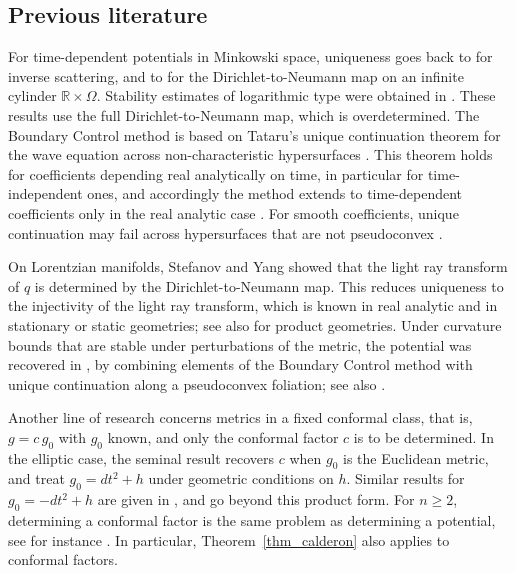 \documentclass[12pt,reqno]{amsart}
\numberwithin{equation}{section}
\theoremstyle{definition}
\theoremstyle{plain}
\theoremstyle{definition}
\theoremstyle{definition}
\newcommand{\R}{\mathbb{R}}
\def\R{\mathbb R}
\begin{document}
\subsection{Previous literature}

For time-dependent potentials in Minkowski space, uniqueness goes back to \cite{stefanov1989uniqueness} for inverse scattering, and to \cite{ramm1991} for the Dirichlet-to-Neumann map on an infinite cylinder $\R\times\Omega$. Stability estimates of logarithmic type were obtained in \cite{ben-aicha2015}. These results use the full Dirichlet-to-Neumann map, which is overdetermined. The Boundary Control method \cite{belishev1988} is based on Tataru's unique continuation theorem for the wave equation across non-characteristic hypersurfaces \cite{tataru1995}. This theorem holds for coefficients depending real analytically on time, in particular for time-independent ones, and accordingly the method extends to time-dependent coefficients only in the real analytic case \cite{eskin2007}. For smooth coefficients, unique continuation may fail across hypersurfaces that are not pseudoconvex \cite{alinhac1983}.

On Lorentzian manifolds, Stefanov and Yang \cite{stefanov2018} showed that the light ray transform of $q$ is determined by the Dirichlet-to-Neumann map. This reduces uniqueness to the injectivity of the light ray transform, which is known in real analytic \cite{stefanov2017support} and in stationary or static \cite{feizmohammadi2021light} geometries; see also \cite{kian2019a,feizmohammadi2021b} for product geometries. Under curvature bounds that are stable under perturbations of the metric, the potential was recovered in \cite{alexakis2022}, by combining elements of the Boundary Control method with unique continuation along a pseudoconvex foliation; see also \cite{alexakis2023,gomes2025}.

Another line of research concerns metrics in a fixed conformal class, that is, $g=c\,g_0$ with $g_0$ known, and only the conformal factor $c$ is to be determined. In the elliptic case, the seminal result \cite{sylvester1987} recovers $c$ when $g_0$ is the Euclidean metric, and \cite{dos-santos-ferreira2009,dos-santos-ferreira2016,carstea2023} treat $g_0=dt^2+h$ under geometric conditions on $h$. Similar results for $g_0=-dt^2+h$ are given in \cite{kian2019a,feizmohammadi2021b}, and \cite{stefanov2018,alexakis2022} go beyond this product form. For $n\ge2$, determining a conformal factor is the same problem as determining a potential, see for instance \cite{alexakis2022}. In particular, Theorem~\ref{thm_calderon} also applies to conformal factors.
\end{document}
